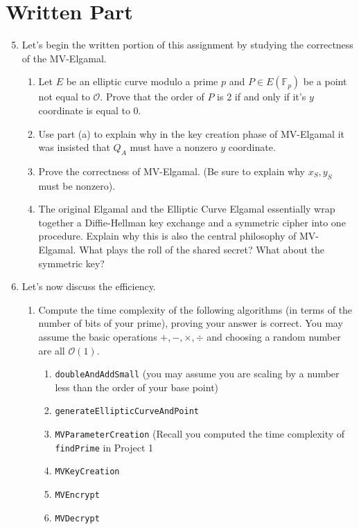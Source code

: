 \documentclass[11pt]{article}
\newcommand{\bF}{\mathbb{F}}
\newcommand{\cO}{\mathcal{O}}
\begin{document}
\section*{Written Part}
\begin{enumerate}
  \setcounter{enumi}{4}
  \item{Let's begin the written portion of this assignment by studying the correctness of the MV-Elgamal.
  \begin{enumerate}
    \item{
    Let $E$ be an elliptic curve modulo a prime $p$ and $P\in E(\bF_p)$ be a point not equal to $\cO$.  Prove that the order of $P$ is 2 if and only if it's $y$ coordinate is equal to 0.}
    \item{
    Use part (a) to explain why in the key creation phase of MV-Elgamal it was insisted that $Q_A$ must have a nonzero $y$ coordinate.
    }
    \item{
    Prove the correctness of MV-Elgamal.  (Be sure to explain why $x_S,y_S$ must be nonzero).
    }
    \item{
    The original Elgamal and the Elliptic Curve Elgamal essentially wrap together a Diffie-Hellman key exchange and a symmetric cipher into one procedure.  Explain why this is also the central philosophy of MV-Elgamal.  What plays the roll of the shared secret?  What about the symmetric key?
    }
  \end{enumerate}
  }
  \item{Let's now discuss the efficiency.
  \begin{enumerate}
    \item{Compute the time complexity of the following algorithms (in terms of the number of bits of your prime), proving your answer is correct.  You may assume the basic operations $+,-,\times,\div$ and choosing a random number are all $\cO(1)$. 
    \begin{enumerate}
    \item{\verb|doubleAndAddSmall| (you may assume you are scaling by a number less than the order of your base point)}
    \item{\verb|generateEllipticCurveAndPoint|}
    \item{\verb|MVParameterCreation| (Recall you computed the time complexity of \verb|findPrime| in Project 1}
    \item{\verb|MVKeyCreation|}
    \item{\verb|MVEncrypt|}
    \item{\verb|MVDecrypt|}
    \end{enumerate}
}
\end{enumerate}}
\end{enumerate}
\end{document}

